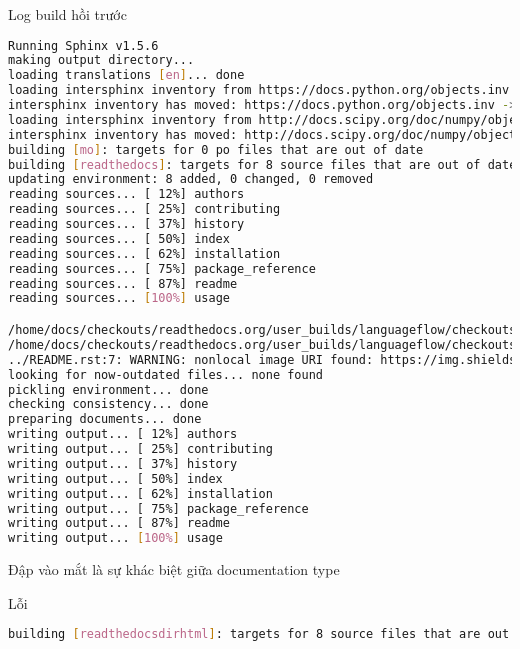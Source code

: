 Log build hồi trước

\begin{lstlisting}[language=bash]
Running Sphinx v1.5.6
making output directory...
loading translations [en]... done
loading intersphinx inventory from https://docs.python.org/objects.inv...
intersphinx inventory has moved: https://docs.python.org/objects.inv -> https://docs.python.org/2/objects.inv
loading intersphinx inventory from http://docs.scipy.org/doc/numpy/objects.inv...
intersphinx inventory has moved: http://docs.scipy.org/doc/numpy/objects.inv -> https://docs.scipy.org/doc/numpy/objects.inv
building [mo]: targets for 0 po files that are out of date
building [readthedocs]: targets for 8 source files that are out of date
updating environment: 8 added, 0 changed, 0 removed
reading sources... [ 12%] authors
reading sources... [ 25%] contributing
reading sources... [ 37%] history
reading sources... [ 50%] index
reading sources... [ 62%] installation
reading sources... [ 75%] package_reference
reading sources... [ 87%] readme
reading sources... [100%] usage

/home/docs/checkouts/readthedocs.org/user_builds/languageflow/checkouts/develop/languageflow/transformer/count.py:docstring of languageflow.transformer.count.CountVectorizer:106: WARNING: Definition list ends without a blank line; unexpected unindent.
/home/docs/checkouts/readthedocs.org/user_builds/languageflow/checkouts/develop/languageflow/transformer/tfidf.py:docstring of languageflow.transformer.tfidf.TfidfVectorizer:113: WARNING: Definition list ends without a blank line; unexpected unindent.
../README.rst:7: WARNING: nonlocal image URI found: https://img.shields.io/badge/latest-1.1.6-brightgreen.svg
looking for now-outdated files... none found
pickling environment... done
checking consistency... done
preparing documents... done
writing output... [ 12%] authors
writing output... [ 25%] contributing
writing output... [ 37%] history
writing output... [ 50%] index
writing output... [ 62%] installation
writing output... [ 75%] package_reference
writing output... [ 87%] readme
writing output... [100%] usage
\end{lstlisting}

Đập vào mắt là sự khác biệt giữa documentation type

Lỗi

\begin{lstlisting}[language=bash]
building [readthedocsdirhtml]: targets for 8 source files that are out of date
\end{lstlisting}

